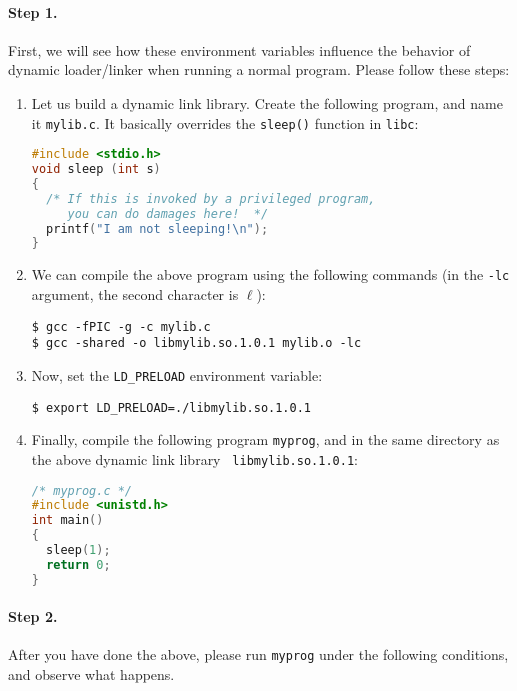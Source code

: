 \paragraph{Step 1.}
First, we will see how these environment variables influence the
behavior of dynamic loader/linker when running a normal program.
Please follow these steps:


\begin{enumerate}
  \item Let us build a dynamic link library. Create the following program,
  and name it {\tt mylib.c}. It basically overrides the {\tt sleep()} function
  in {\tt libc}:
\begin{lstlisting}[language=C]
#include <stdio.h>
void sleep (int s)
{
  /* If this is invoked by a privileged program,
     you can do damages here!  */
  printf("I am not sleeping!\n");
}
\end{lstlisting}

  \item We can compile the above program using the following commands (in the
  {\tt -lc} argument, the second character is $\ell$):
\begin{lstlisting}
$ gcc -fPIC -g -c mylib.c
$ gcc -shared -o libmylib.so.1.0.1 mylib.o -lc
\end{lstlisting}



  \item Now, set the {\tt LD\_PRELOAD} environment variable:
\begin{lstlisting}
$ export LD_PRELOAD=./libmylib.so.1.0.1
\end{lstlisting}

  \item Finally, compile the following program {\tt myprog}, and
  in the same directory as the above dynamic link library {\tt
  libmylib.so.1.0.1}:
\begin{lstlisting}[language=C]
/* myprog.c */
#include <unistd.h>
int main()
{
  sleep(1);
  return 0;
}
\end{lstlisting}
\end{enumerate}


\paragraph{Step 2.}
After you have done the above, please run {\tt myprog} under the following
conditions, and observe what happens.

